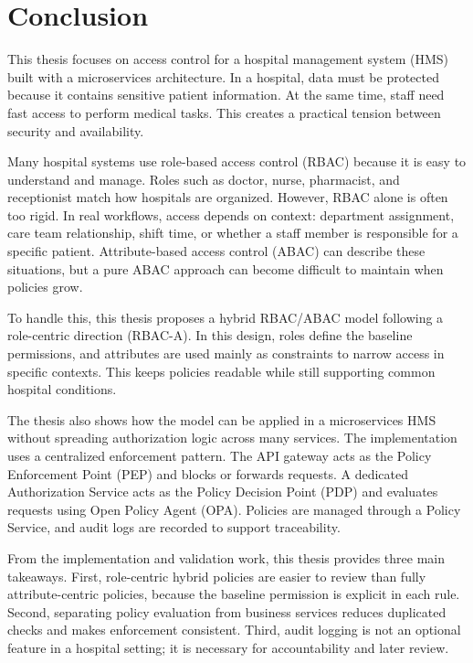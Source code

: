 \section{Conclusion}
\label{sec:conclusion}
This thesis focuses on access control for a hospital management system (HMS) built with a microservices architecture.
In a hospital, data must be protected because it contains sensitive patient information. At the same time, staff need fast
access to perform medical tasks. This creates a practical tension between security and availability.
\vspace{0.5cm}


Many hospital systems use role-based access control (RBAC) because it is easy to understand and manage. Roles such as
doctor, nurse, pharmacist, and receptionist match how hospitals are organized. However, RBAC alone is often too rigid.
In real workflows, access depends on context: department assignment, care team relationship, shift time, or whether a staff
member is responsible for a specific patient. Attribute-based access control (ABAC) can describe these situations, but a
pure ABAC approach can become difficult to maintain when policies grow.
\vspace{0.5cm}


To handle this, this thesis proposes a hybrid RBAC/ABAC model following a role-centric direction (RBAC-A). In this design,
roles define the baseline permissions, and attributes are used mainly as constraints to narrow access in specific contexts.
This keeps policies readable while still supporting common hospital conditions.
\vspace{0.5cm}


The thesis also shows how the model can be applied in a microservices HMS without spreading authorization logic across
many services. The implementation uses a centralized enforcement pattern. The API gateway acts as the Policy Enforcement Point
(PEP) and blocks or forwards requests. A dedicated Authorization Service acts as the Policy Decision Point (PDP) and
evaluates requests using Open Policy Agent (OPA). Policies are managed through a Policy Service, and audit logs are recorded
to support traceability.
\vspace{0.5cm}


From the implementation and validation work, this thesis provides three main takeaways. First, role-centric hybrid policies
are easier to review than fully attribute-centric policies, because the baseline permission is explicit in each rule.
Second, separating policy evaluation from business services reduces duplicated checks and makes enforcement consistent.
Third, audit logging is not an optional feature in a hospital setting; it is necessary for accountability and later review.
\vspace{0.5cm}


